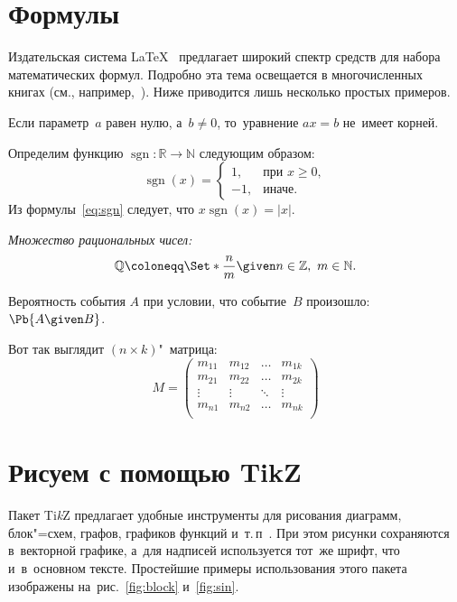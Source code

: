 \documentclass[a4paper,12pt]{diplom}
\newcommand{\N}{\mathbb{N}}  %
\newcommand{\Z}{\mathbb{Z}}  %
\newcommand{\R}{\mathbb{R}}  %
\DeclareMathOperator{\sgn}{sgn} %
\newcommand{\from}{\colon} %
\renewcommand{\ge}{\geqslant}
\begin{document}
\chapter{Формулы}

Издательская система \LaTeX~\cite{TeX:YarSU} предлагает широкий спектр средств для набора математических формул.
Подробно эта тема освещается в многочисленных книгах (см., например,~\cite{Oetiker:2016, Kotelnikov:2004}).
Ниже приводится лишь несколько простых примеров.

Если параметр~$a$ равен нулю, а~$b \ne 0$, то~уравнение \(a x = b\) не~имеет корней.

Определим функцию $\sgn \from \R \to \N$ следующим образом:
\begin{equation}
\sgn(x) = \begin{cases}
	 1, & \text{при } x \ge 0,\\
	-1, & \text{иначе.}
\end{cases}
\label{eq:sgn}
\end{equation}
Из формулы~\eqref{eq:sgn} следует, что $x \sgn(x) = |x|$.

\emph{Множество рациональных чисел:}
\[ 
	\mathbb{Q} \coloneqq \Set*{ \frac{n}{m} \given n\in\Z, \ m\in\N}.
\]

Вероятность события $A$ при условии, что событие~$B$ произошло:
$\Pb{A \given B}$.

Вот так выглядит $(n\times k)$"~матрица:
\begin{equation}
M = \begin{pmatrix}
	m_{11} & m_{12} & \dots & m_{1k} \\
	m_{21} & m_{22} & \dots & m_{2k} \\
	\vdots & \vdots & \ddots & \vdots \\
	m_{n1} & m_{n2} & \dots & m_{nk} \\
	\end{pmatrix}
	\label{eq:matrix}
\end{equation}


\chapter{Рисуем с помощью TikZ}

Пакет Ti\textit{k}Z предлагает удобные инструменты для рисования диаграмм, блок"=схем, графов, графиков функций и~т.\,п~\cite{tikz, Kirutenko:2014}.
При этом рисунки сохраняются в~векторной графике, а~для  надписей используется тот~же шрифт, что и~в~основном тексте.
Простейшие примеры использования этого пакета изображены на~рис.~\ref{fig:block} и~\ref{fig:sin}.
\end{document}
